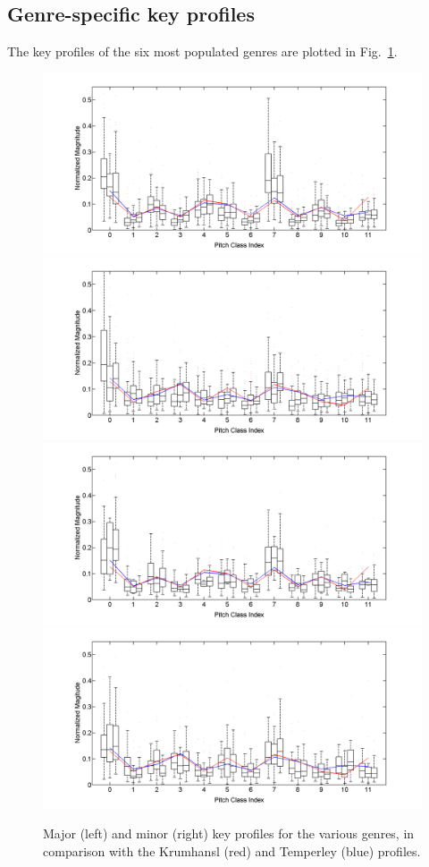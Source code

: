 \documentclass{article}
\begin{document}
\subsection{Genre-specific key profiles}
The key profiles of the six most populated genres are plotted in Fig.~\ref{fig:SpecificKeyProfiles}.
\begin{figure}[tb]
\centering
    \includegraphics[scale=.2]{graph/boxPlotsMajCPR+Krum+Temp}
    \includegraphics[scale=.2]{graph/boxPlotsMinBHP+Krum+Temp}
    \includegraphics[scale=.2]{graph/boxPlotsMajDJRk+Krum+Temp}
    \includegraphics[scale=.2]{graph/boxPlotsMinDMR+Krum+Temp}
	\caption{Major (left) and minor (right) key profiles for the various genres, in comparison with the Krumhansl (red) and Temperley (blue) profiles.}
	\label{fig:SpecificKeyProfiles}
\end{figure}
\end{document}
